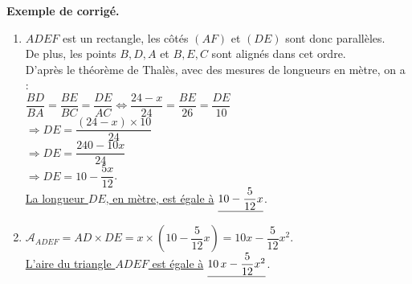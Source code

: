 \begin{activite}
   \textcolor{G1}{
   {\bf Exemple de corrigé.} \smallskip
      \begin{enumerate}
         \item $ADEF$ est un rectangle, les côtés $(AF)$ et $(DE)$ sont donc parallèles. \\
            De plus, les points $B, D, A$ et $B, E, C$ sont alignés dans cet ordre. \\
            D'après le théorème de Thalès, avec des mesures de longueurs en mètre, on a : \\ [1mm]
            $\dfrac{BD}{BA} =\dfrac{BE}{BC} =\dfrac{DE}{AC} \iff \dfrac{24-x}{24} =\dfrac{BE}{26} =\dfrac{DE}{10}$ \\ [1mm]
            \hspace*{2.7cm} $\Longrightarrow DE =\dfrac{(24-x)\times10}{24}$ \\ [1mm]
            \hspace*{2.7cm} $\Longrightarrow DE  =\dfrac{240-10x}{24}$ \\ [1mm]
            \hspace*{2.7cm} $\Longrightarrow DE =10-\dfrac{5x}{12}$. \\ [1mm]
            \uline{La longueur $DE$, en mètre, est égale à} $\uline{10-\dfrac{5}{12}x}$. \medskip     
         \item $\mathcal{A}_{ADEF} =AD\times DE =x\times\left(10-\dfrac{5}{12}x\right) =10x-\dfrac{5}{12}x^2$. \\ [1mm]
            \uline{L'aire du triangle $ADEF$ est égale à} $\uline{10\,x-\dfrac{5}{12}x^2}$.           
      \end{enumerate}
   }
\end{activite}


\exercicesbase

